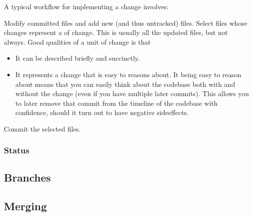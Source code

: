 A typical workflow for implementing a change involves:
\begin{enumerate}
   Modify committed files and add new (and thus untracked) files.
   Select files whose changes represent a  of change. This is usually all the updated files, but not always. Good qualities of a unit of change is that
    \begin{itemize}
      \item It can be described briefly and succinctly.
      \item It represents a change that is easy to reasons about. It being easy to reason about means that you can easily think about the codebase both with and without the change (even if you have multiple later commits). This allows you to later remove that commit from the timeline of the codebase with confidence, should it turn out to have negative sideeffects.
    \end{itemize}
   Commit the selected files.
\end{enumerate}

\subsubsection{Status}

\subsection{Branches}

\subsection{Merging}
\label{topics:vcs:merging}

